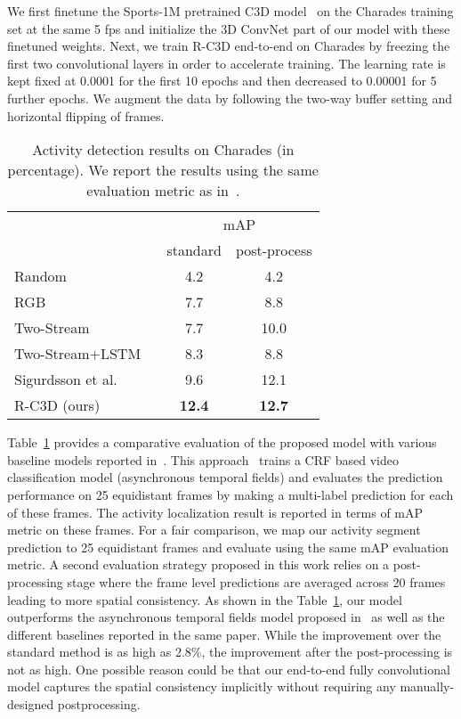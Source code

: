 \documentclass[10pt,twocolumn,letterpaper]{article}
\newcommand{\modelname}[0]{R-C3D }
\begin{document}
We first finetune the Sports-1M pretrained C3D model~\cite{tran2015learning} on the Charades training set at the same 5 fps and initialize the 3D ConvNet part of our model with these finetuned weights.
Next, we train \modelname end-to-end on Charades by freezing the first two convolutional layers in order to accelerate training.
The learning rate is kept fixed at 0.0001 for the first 10 epochs and then decreased to 0.00001 for 5 further epochs.
We augment the data by following the two-way buffer setting and horizontal flipping of frames.

\begin{table}[!t]
\centering
\caption{Activity detection results on Charades (in percentage). We report the results using the same evaluation metric as in~\cite{sigurdsson2016asynchronous}.
}
\small
\begin{tabular}{l || c c } 
\hline
 ~ & \multicolumn{2}{c}{mAP} \\ 
 ~ & \!\!\! standard \!\!\!\!\!\! & post-process \\ \hline
 
\!\!\!Random ~\cite{sigurdsson2016asynchronous} & 4.2 & 4.2 \\ \!\!\!RGB ~\cite{sigurdsson2016asynchronous} & 7.7 & 8.8 \\ \!\!\!Two-Stream ~\cite{sigurdsson2016asynchronous} & 7.7 & 10.0 \\ \!\!\!Two-Stream+LSTM ~\cite{sigurdsson2016asynchronous} \!\!\! & 8.3 &  8.8 \\ \!\!\!Sigurdsson et al.~\cite{sigurdsson2016asynchronous} & 9.6 & 12.1 \\ \hline
\!\!\!\modelname (ours)& \bf{12.4} & \bf{12.7}\\ \hline 
\end{tabular}
\vspace{-0.2in}
\label{res:charades}
\end{table}

Table~\ref{res:charades} provides a comparative evaluation of the proposed model with various baseline models reported in~\cite{sigurdsson2016asynchronous}.
This approach~\cite{sigurdsson2016asynchronous} trains a CRF based video classification model (asynchronous temporal fields) and evaluates the prediction performance on 25 equidistant frames by making a multi-label prediction for each of these frames.
The activity localization result is reported in terms of mAP metric on these frames.
For a fair comparison, we map our activity segment prediction to 25 equidistant frames and evaluate using the same mAP evaluation metric.
A second evaluation strategy proposed in this work relies on a post-processing stage where the frame level predictions are averaged across 20 frames leading to more spatial consistency.
As shown in the  Table~\ref{res:charades}, our model outperforms the asynchronous temporal fields model proposed in~\cite{sigurdsson2016asynchronous} as well as the different baselines reported in the same paper.
While the improvement over the standard method is as high as 2.8\%, the improvement after the post-processing is not as high.
One possible reason could be that our end-to-end fully convolutional model captures the spatial consistency implicitly without requiring any manually-designed postprocessing.
\end{document}
